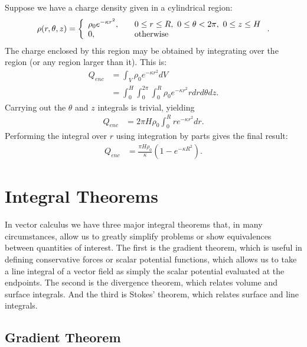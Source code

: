 Suppose we have a charge density given in a cylindrical region:
\begin{align}
  \rho(r,\theta,z) = \left\{ \begin{array}{l l} 
    \rho_0 e^{-\kappa r^2 }, & \quad 0 \le r \le R, \  0 \le \theta < 2\pi, \  0 \le z \le H \\
    0, & \quad \text{otherwise} \\ \end{array} \right. .
\end{align}
The charge enclosed by this region may be obtained by integrating over the region (or any region larger than it). This is:
\begin{align}
  Q_{enc} &= \int_V \rho_0 e^{-\kappa r^2 } dV \nonumber \\
  &= \int_0^H \int_0^{2\pi} \int_0^R \rho_0 e^{-\kappa r^2 } r dr d\theta dz .
\end{align}
Carrying out the $\theta$ and $z$ integrals is trivial, yielding
\begin{align}
  Q_{enc} &= 2\pi H \rho_0 \int_0^R  r e^{-\kappa r^2 } dr .
\end{align}
Performing the integral over $r$ using integration by parts gives the final result:
\begin{align}
  Q_{enc} &= \frac{\pi H \rho_0}{\kappa} ( 1 - e^{-\kappa R^2} ).
\end{align}

\section{Integral Theorems}

In vector calculus we have three major integral theorems that, in many circumstances, allow us to greatly simplify problems or show equivalences between quantities of interest. The first is the gradient theorem, which is useful in defining conservative forces or scalar potential functions, which allows us to take a line integral of a vector field as simply the scalar potential evaluated at the endpoints. The second is the divergence theorem, which relates volume and surface integrals. And the third is Stokes' theorem, which relates surface and line integrals.

\subsection{Gradient Theorem}

